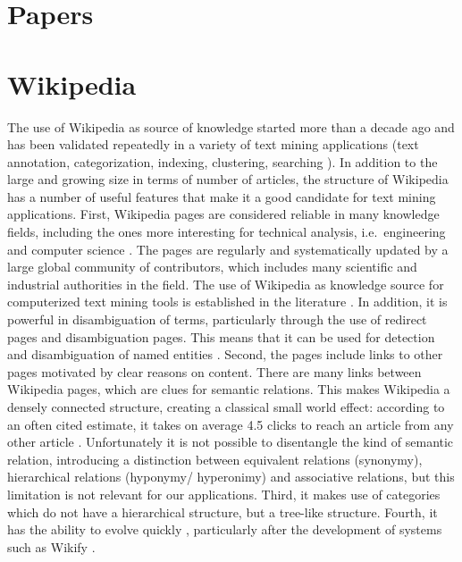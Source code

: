 \documentclass[]{book}
\begin{document}
\section{Papers}\label{sotadocumentspapers}

\section{Wikipedia}\label{sotadocumentswiki}

The use of Wikipedia as source of knowledge started more than a decade
ago and has been validated repeatedly in a variety of text mining
applications (text annotation, categorization, indexing, clustering,
searching \citep{milne2008learning}). In addition to the large and
growing size in terms of number of articles, the structure of Wikipedia
has a number of useful features that make it a good candidate for text
mining applications. First, Wikipedia pages are considered reliable in
many knowledge fields, including the ones more interesting for technical
analysis, i.e.~engineering and computer science \citep{xu2015improving}.
The pages are regularly and systematically updated by a large global
community of contributors, which includes many scientific and industrial
authorities in the field. The use of Wikipedia as knowledge source for
computerized text mining tools is established in the literature
\citep{ferragina2012fast}. In addition, it is powerful in disambiguation
of terms, particularly through the use of redirect pages and
disambiguation pages. This means that it can be used for detection and
disambiguation of named entities \citep{bunescu2006using}. Second, the
pages include links to other pages motivated by clear reasons on
content. There are many links between Wikipedia pages, which are clues
for semantic relations. This makes Wikipedia a densely connected
structure, creating a classical small world effect: according to an
often cited estimate, it takes on average 4.5 clicks to reach an article
from any other article \citep{dolan2008six}. Unfortunately it is not
possible to disentangle the kind of semantic relation, introducing a
distinction between equivalent relations (synonymy), hierarchical
relations (hyponymy/ hyperonimy) and associative relations, but this
limitation is not relevant for our applications. Third, it makes use of
categories which do not have a hierarchical structure, but a tree-like
structure. Fourth, it has the ability to evolve quickly
\citep{lih2004wikipedia}, particularly after the development of systems
such as Wikify \citep[\citet{cheng2013relational}]{mihalcea2007wikify}.
\end{document}
